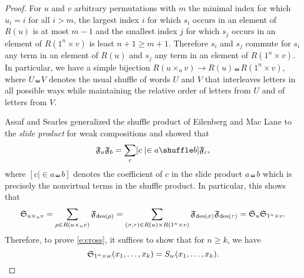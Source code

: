 \documentclass[11pt]{amsart}
\theoremstyle{definition}
\theoremstyle{remark}
\numberwithin{equation}{section}
\newcommand{\des}{\ensuremath\mathrm{des}}
\newcommand{\R}{\ensuremath{R}}
\newcommand{\schubert}{\ensuremath\mathfrak{S}}
\newcommand{\fund}{\ensuremath\mathfrak{F}}
\newcommand{\stanley}{\ensuremath{S}}
\begin{document}
\begin{proof}
  For $u$ and $v$ arbitrary permutations with $m$ the minimal index for which $u_i = i$ for all $i>m$, the largest index $i$ for which $s_i$ occurs in an element of $\R(u)$ is at most $m-1$ and the smallest index $j$ for which $s_j$ occurs in an element of $\R(1^n \times v)$ is least $n+1 \geq m+1$. Therefore $s_i$ and $s_j$ commute for $s_i$ any term in an element of $\R(u)$ and $s_j$ any term in an element of $\R(1^n \times v)$. In particular, we have a simple bijection $\R(u \times_n v) \rightarrow \R(u) \shuffle \R(1^n \times v)$, where $U\shuffle V$ denotes the usual shuffle of words $U$ and $V$ that interleaves letters in all possible ways while maintaining the relative order of letters from $U$ and of letters from $V$.

  Assaf and Searles \cite{AS17} generalized the shuffle product of Eilenberg and Mac Lane \cite{EM53} to the \emph{slide product} for weak compositions and showed that
  \begin{equation}
    \fund_a \fund_b = \sum_{c} [c \mid  \in a \shuffle b] \fund_c,
  \end{equation}
  where $[c \mid  \in a \shuffle b]$ denotes the coefficient of $c$ in the slide product $a \shuffle b$ which is precisely the nonvirtual terms in the shuffle product. In particular, this shows that
  \begin{displaymath}
    \schubert_{u \times_n v} = \sum_{\rho \in \R(u \times_n v)} \fund_{\des(\rho)} = \sum_{(\sigma,\tau) \in \R(u) \times R(1^n \times v)} \fund_{\des(\sigma)} \fund_{\des(\tau)} = \schubert_u \schubert_{1^n \times v}.
  \end{displaymath}
  Therefore, to prove \eqref{e:cross}, it suffices to show that for $n\geq k$, we have
  \begin{equation}
    \schubert_{1^n \times w} (x_1,\ldots,x_k) = \stanley_w(x_1,\ldots,x_k).
    \label{e:1down}
  \end{equation}


\end{proof}
\end{document}
